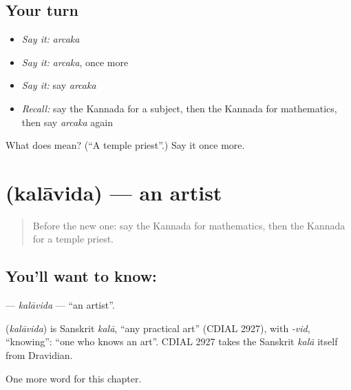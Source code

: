 \subsection*{Your turn}
\begin{itemize}
\raggedright
  \item \emph{Say it:} \emph{arcaka}
  \item \emph{Say it:} \emph{arcaka}, once more
  \item \emph{Say it:} say \emph{arcaka}
  \item \emph{Recall:} say the Kannada for a subject, then the Kannada for mathematics, then say \emph{arcaka} again
\end{itemize}

\begin{tcolorbox}[breakable,colback=teal!4,colframe=teal!35!black,title={Before you move on}]
What does  mean? (\textquotedblleft{}A temple priest\textquotedblright{}.) Say it once more.
\end{tcolorbox}
\section[\texorpdfstring{\kn{ಕಲಾವಿದ} (kalāvida)}{ಕಲಾವಿದ (kalāvida)}]{ (kalāvida) — an artist}

\label{lesson:KA-C305-kalavida}



\begin{quote}
Before the new one: say the Kannada for mathematics, then the Kannada for a temple priest.
\end{quote}

\subsection*{You'll want to know: }
\textbf{} — \emph{kalāvida} — \textquotedblleft{}an artist\textquotedblright{}.

\begin{cousinweb}
\textbf{} (\emph{kalāvida}) is Sanskrit \emph{kalā}, \textquotedblleft{}any practical art\textquotedblright{} (CDIAL 2927), with \emph{-vid}, \textquotedblleft{}knowing\textquotedblright{}: \textquotedblleft{}one who knows an art\textquotedblright{}. CDIAL 2927 takes the Sanskrit \emph{kalā} itself from Dravidian.
\end{cousinweb}

\begin{grammarlens}[title={What you've built}]
One more word for this chapter.
\end{grammarlens}

